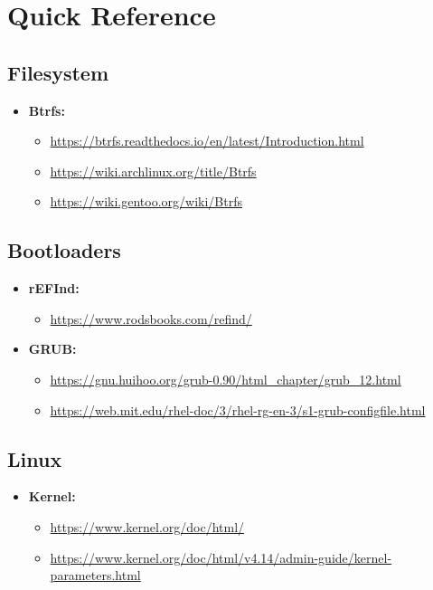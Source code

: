 \documentclass[10pt, a4paper, onecolumn, oneside, titlepage, openany]{book}
\begin{document}
\chapter{Quick Reference}
\section{Filesystem}
\begin{itemize}
    \item \textbf{Btrfs:}
    \begin{itemize}
        \item \url{https://btrfs.readthedocs.io/en/latest/Introduction.html}
        \item \url{https://wiki.archlinux.org/title/Btrfs}
        \item \url{https://wiki.gentoo.org/wiki/Btrfs}
    \end{itemize}
\end{itemize}

\section{Bootloaders}
\begin{itemize}
    \item \textbf{rEFInd:}
    \begin{itemize}
        \item \url{https://www.rodsbooks.com/refind/}
    \end{itemize}
    \item \textbf{GRUB:}
    \begin{itemize}
        \item \url{https://gnu.huihoo.org/grub-0.90/html_chapter/grub_12.html}
        \item \url{https://web.mit.edu/rhel-doc/3/rhel-rg-en-3/s1-grub-configfile.html}
    \end{itemize}
\end{itemize}

\section{Linux}
\begin{itemize}
    \item \textbf{Kernel:}
    \begin{itemize}
        \item \url{https://www.kernel.org/doc/html/}
        \item \url{https://www.kernel.org/doc/html/v4.14/admin-guide/kernel-parameters.html}
    \end{itemize}
\end{itemize}
\end{document}
